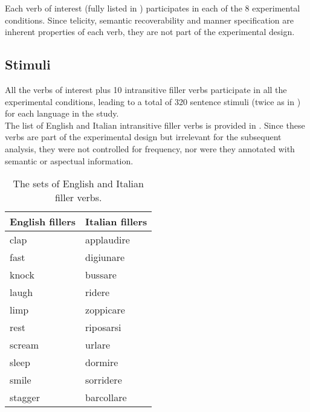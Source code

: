 Each verb of interest (fully listed in ) participates in each of the 8 experimental conditions. Since telicity, semantic recoverability and manner specification are inherent properties of each verb, they are not part of the experimental design.

\subsection{Stimuli} 

All the verbs of interest plus 10 intransitive filler verbs participate in all the experimental conditions, leading to a total of 320 sentence stimuli (twice as in \textcite{Medina2007}) for each language in the study.\\
The list of English and Italian intransitive filler verbs is provided in . Since these verbs are part of the experimental design but irrelevant for the subsequent analysis, they were not controlled for frequency, nor were they annotated with semantic or aspectual information.

\begin{table}[htb] %
\caption{The sets of English and Italian filler verbs.}
\begin{tabular}{ll}
English fillers & Italian fillers \\
\hline
clap	&	applaudire	\\
fast	&	digiunare	\\
knock	&	bussare	\\
laugh	&	ridere	\\
limp	&	zoppicare	\\
rest	&	riposarsi\\
scream	&	urlare	\\
sleep	&	dormire	\\
smile	&	sorridere	\\
stagger	&	barcollare       
\end{tabular}
\end{table}

